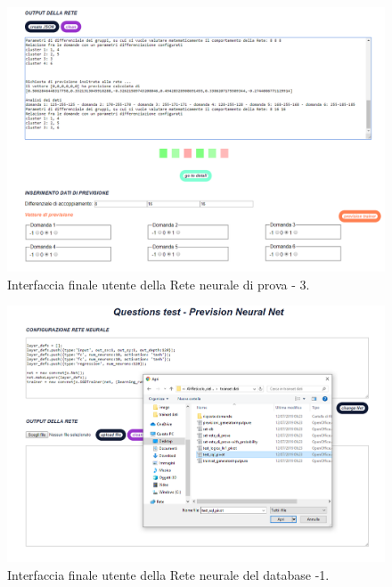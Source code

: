 \begin{figure}[H]
\centering
	\includegraphics[width=1\linewidth]{./image/Rete-di-prova_finale3.png}
	\caption{Interfaccia finale utente della Rete neurale di prova - 3.}
	\label{Interfaccia finale utente della Rete neurale di prova - 3.}
\end{figure}
\noindent

\begin{figure}[H]
\centering
	\includegraphics[width=1\linewidth]{./image/Rete-di-prova_db.png}
	\caption{Interfaccia finale utente della Rete neurale del database -1.}
	\label{Interfaccia finale utente della Rete neurale del database -1.}
\end{figure}
\noindent

